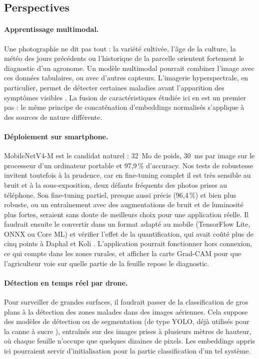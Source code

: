 \subsection{Perspectives}

\paragraph{Apprentissage multimodal.} Une photographie ne dit pas tout : la variété cultivée, l'âge de la culture, la météo des jours précédents ou l'historique de la parcelle orientent fortement le diagnostic d'un agronome. Un modèle multimodal pourrait combiner l'image avec ces données tabulaires, ou avec d'autres capteurs. L'imagerie hyperspectrale, en particulier, permet de détecter certaines maladies avant l'apparition des symptômes visibles \cite{rumpf2010early, mahlein2016plant}. La fusion de caractéristiques étudiée ici en est un premier pas : le même principe de concaténation d'embeddings normalisés s'applique à des sources de nature différente.

\paragraph{Déploiement sur smartphone.} MobileNetV4-M est le candidat naturel : 32~Mo de poids, 30~ms par image sur le processeur d'un ordinateur portable et 97,9\,\% d'accuracy. Nos tests de robustesse invitent toutefois à la prudence, car en fine-tuning complet il est très sensible au bruit et à la sous-exposition, deux défauts fréquents des photos prises au téléphone. Son fine-tuning partiel, presque aussi précis (96,4\,\%) et bien plus robuste, ou un entraînement avec des augmentations de bruit et de luminosité plus fortes, seraient sans doute de meilleurs choix pour une application réelle. Il faudrait ensuite le convertir dans un format adapté au mobile (TensorFlow Lite, ONNX ou Core ML) et vérifier l'effet de la quantification, qui avait coûté plus de cinq points à Daphal et Koli \cite{daphal2024enhanced}. L'application pourrait fonctionner hors connexion, ce qui compte dans les zones rurales, et afficher la carte Grad-CAM pour que l'agriculteur voie sur quelle partie de la feuille repose le diagnostic.

\paragraph{Détection en temps réel par drone.} Pour surveiller de grandes surfaces, il faudrait passer de la classification de gros plans à la détection des zones malades dans des images aériennes. Cela suppose des modèles de détection ou de segmentation (de type YOLO, déjà utilisés pour la canne à sucre \cite{kumpala2022sugarcane, malik2021disease}), entraînés sur des images prises à plusieurs mètres de hauteur, où chaque feuille n'occupe que quelques dizaines de pixels. Les embeddings appris ici pourraient servir d'initialisation pour la partie classification d'un tel système.


